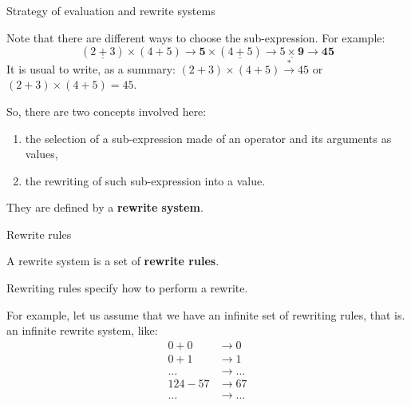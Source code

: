 \documentclass[compress,dvipdfmx]{beamer}
\begin{document}
%
\begin{frame}{Strategy of evaluation and rewrite systems}

  Note that there are different ways to choose the sub-expression. For
  example:
  \begin{equation*}
    (\underline{2+3}) \times (4+5) \rightarrow \textbf{5} \times
    (\underline{4+5}) \rightarrow \underline{5 \times \textbf{9}}
    \rightarrow \textbf{45}
  \end{equation*}
  It is usual to write, as a summary: \((2+3)\times(4+5)
  \xrightarrow{*} 45\) or \((2+3)\times(4+5)=45\).

  \bigskip

  So, there are two concepts involved here:
  \begin{enumerate}

    \item the selection of a sub-expression made of an operator and
      its arguments as values,

    \item the rewriting of such sub-expression into a value.

  \end{enumerate}
  They are defined by a \textbf{rewrite system}.

\end{frame}

%
\begin{frame}{Rewrite rules}

  A rewrite system is a set of \textbf{rewrite rules}.

  \bigskip

  Rewriting rules specify how to perform a rewrite.

  \bigskip

  For example, let us assume that we have an infinite set of rewriting
  rules, that is. an infinite rewrite system, like:
  \begin{align*}
    0 + 0 & \rightarrow 0\\
    0 + 1 & \rightarrow 1\\
    \dots & \rightarrow \dots\\
    124 - 57 & \rightarrow 67\\
    \dots & \rightarrow \dots
  \end{align*}

\end{frame}
\end{document}
